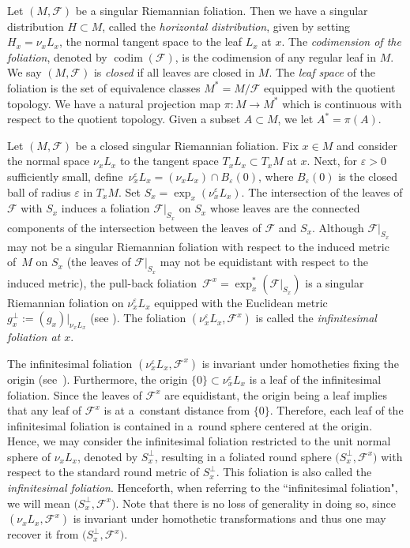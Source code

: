 \documentclass[10pt,a4paper]{amsart}
\numberwithin{equation}{section}
\theoremstyle{definition}
\DeclareMathOperator{\codim}{codim}
\newcommand{\fol}{\mathcal{F}}
\begin{document}
Let $(M,\fol)$ be a singular Riemannian foliation. Then we have a singular distribution $H\subset M$, called the \emph{horizontal distribution}, given by setting $H_x = \nu_x L_x$, the normal tangent space to the leaf $L_x$ at $x$. The \emph{codimension of the foliation}, denoted by $\codim (\fol)$, is the codimension of any regular leaf in $M$. We say $(M,\fol)$ is \emph{closed} if all leaves are closed in $M$.
The \emph{leaf space} of the foliation is the set of equivalence classes $M^\ast = M/\fol$ equipped with the quotient topology. We have a natural projection map $\pi\colon M\to M^\ast$ which is continuous with respect to the quotient topology. Given a subset $A\subset M$, we let $A^\ast = \pi(A)$.


Let $(M,\fol)$ be a closed singular Riemannian foliation. Fix $x\in M$ and consider the normal space $\nu_x L_x$ to the tangent space $T_xL_x\subset T_x M$ at $x$.
Next, for $\varepsilon > 0$ sufficiently small, define~${\nu_x^\varepsilon L_x = (\nu_x L_x) \cap B_{\varepsilon}(0)}$, where $B_{\varepsilon}(0)$ is the closed ball of radius $\varepsilon$ in $T_x M$.
Set $S_x = \exp_{x}(\nu_x^\varepsilon L_x)$.
The intersection of the leaves of $\fol$ with $S_x$ induces a foliation $\fol |_{S_x}$ on $S_x$ whose leaves are the connected components of the intersection between the leaves of $\fol$ and $S_x$.
Although $\fol|_{S_x}$ may not be a singular Riemannian foliation with respect to the induced metric of~$M$ on $S_x$ (the leaves of $\fol|_{S_x}$ may not be equidistant with respect to the induced metric), the pull-back foliation~${\fol^x = \exp_x^{\ast}(\fol|_{S_x})}$ is a singular Riemannian foliation on $\nu_x^\varepsilon L_x$ equipped with the Euclidean metric $g^\perp_x:=(g_x)|_{\nu_x L_x}$ (see \cite[Proposition~6.5]{Molino}).
The foliation $(\nu_x^\varepsilon L_x, \fol^x)$ is called the \emph{infinitesimal foliation at $x$}.

The infinitesimal foliation $(\nu_x^\varepsilon L_x, \fol^x)$ is invariant under homotheties fixing the origin (see~\cite[Lemma~6.2]{Molino}). Furthermore, the origin $\{0\}\subset \nu_x^\varepsilon L_x$ is a leaf of the infinitesimal foliation.
Since the leaves of $\fol^x$ are equidistant, the origin being a leaf implies that any leaf of $\fol^x$ is at a~constant distance from $\{0\}$. Therefore, each leaf of the infinitesimal foliation is contained in a~round sphere centered at the origin.
Hence, we may consider the infinitesimal foliation restricted to the unit normal sphere of $\nu_x L_x$, denoted by $S^{\bot}_x$, resulting in a foliated round sphere $\bigl(S^{\bot}_x, \fol^x\bigr)$ with respect to the standard round metric of $S^{\bot}_x$. This foliation is also called the \emph{infinitesimal foliation}. Henceforth, when referring to the ``infinitesimal foliation", we will mean $\bigl(S^{\bot}_x, \fol^x\bigr)$. Note that there is no loss of generality in doing so, since $(\nu_x L_x, \fol^x)$ is invariant under homothetic transformations and thus one may recover it from $\bigl(S^{\bot}_x, \fol^x\bigr)$.
\end{document}
